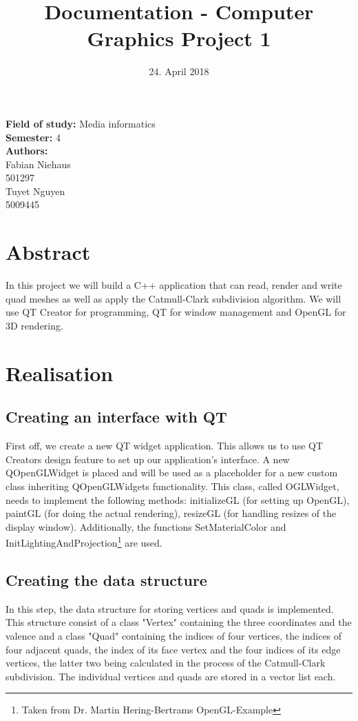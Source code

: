 \documentclass[12pt,a4paper]{scrartcl}
\title{Documentation - Computer Graphics Project 1}
\author{}
\date{24. April 2018}
\begin{document}
\maketitle

\begin{center}

\Large
\textbf{Field of study:} Media informatics
\\
\textbf{Semester:} 4
\\[3cm]
\textbf {Authors:}
\\Fabian Niehaus
\\501297
\\Tuyet Nguyen
\\5009445

\end{center}
\newpage
\Large
\tableofcontents
\newpage
\Large
\vspace{3cm}


\normalsize

\section{Abstract}
In this project we will build a C++ application that can read, render and write quad meshes as well as apply the Catmull-Clark subdivision algorithm. We will use QT Creator for programming, QT for window management and OpenGL for 3D rendering.

\section{Realisation}

\subsection{Creating an interface with QT}\label{subsec:create-interface}
First off, we create a new QT widget application. This allows us to use QT Creators design feature to set up our application's interface. A new QOpenGLWidget is placed and will be used as a placeholder for a new custom class inheriting QOpenGLWidgets functionality. This class, called OGLWidget, needs to implement the following methods: initializeGL (for setting up OpenGL), paintGL (for doing the actual rendering), resizeGL (for handling resizes of the display window). Additionally, the functions SetMaterialColor and InitLightingAndProjection\footnote{Taken from Dr. Martin Hering-Bertrams OpenGL-Example} are used.

\subsection{Creating the data structure}\label{subsec:create-structure}
In this step, the data structure for storing vertices and quads is implemented. This structure consist of a class "Vertex" containing the three coordinates and the valence and a class "Quad" containing the indices of four vertices, the indices of four adjacent quads, the index of its face vertex and the four indices of its edge vertices, the latter two being calculated in the process of the Catmull-Clark subdivision. The individual vertices and quads are stored in a vector list each.
\end{document}
